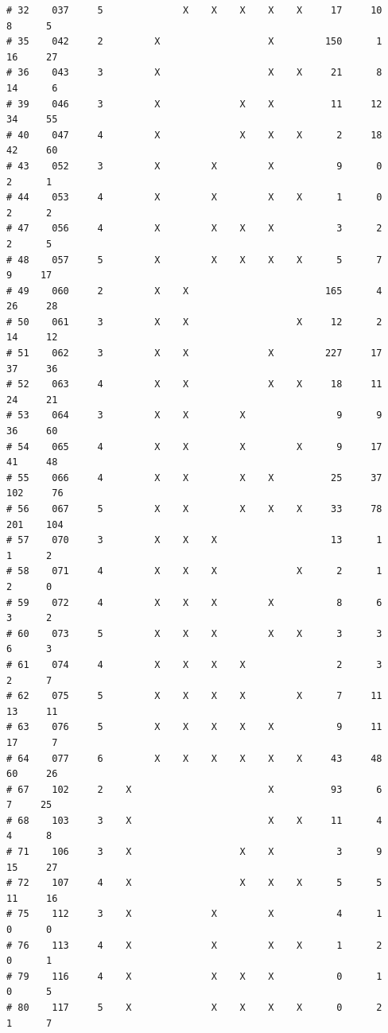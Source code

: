 \documentclass{article}\usepackage[]{graphicx}\usepackage[]{color}
\makeatletter
\newenvironment{kframe}{%
 \def\at@end@of@kframe{}%
 \ifinner\ifhmode%
  \def\at@end@of@kframe{\end{minipage}}%
  \begin{minipage}{\columnwidth}%
 \fi\fi%
 \def\FrameCommand##1{\hskip\@totalleftmargin \hskip-\fboxsep
 \colorbox{shadecolor}{##1}\hskip-\fboxsep
     \hskip-\linewidth \hskip-\@totalleftmargin \hskip\columnwidth}%
 \MakeFramed {\advance\hsize-\width
   \@totalleftmargin\z@ \linewidth\hsize
   \@setminipage}}%
 {\par\unskip\endMakeFramed%
 \at@end@of@kframe}
\newenvironment{knitrout}{}{} %
\makeatother
\begin{document}
\begin{knitrout}
\begin{kframe}
\begin{verbatim}
# 32    037     5              X    X    X    X    X     17     10      8      5
# 35    042     2         X                   X         150      1     16     27
# 36    043     3         X                   X    X     21      8     14      6
# 39    046     3         X              X    X          11     12     34     55
# 40    047     4         X              X    X    X      2     18     42     60
# 43    052     3         X         X         X           9      0      2      1
# 44    053     4         X         X         X    X      1      0      2      2
# 47    056     4         X         X    X    X           3      2      2      5
# 48    057     5         X         X    X    X    X      5      7      9     17
# 49    060     2         X    X                        165      4     26     28
# 50    061     3         X    X                   X     12      2     14     12
# 51    062     3         X    X              X         227     17     37     36
# 52    063     4         X    X              X    X     18     11     24     21
# 53    064     3         X    X         X                9      9     36     60
# 54    065     4         X    X         X         X      9     17     41     48
# 55    066     4         X    X         X    X          25     37    102     76
# 56    067     5         X    X         X    X    X     33     78    201    104
# 57    070     3         X    X    X                    13      1      1      2
# 58    071     4         X    X    X              X      2      1      2      0
# 59    072     4         X    X    X         X           8      6      3      2
# 60    073     5         X    X    X         X    X      3      3      6      3
# 61    074     4         X    X    X    X                2      3      2      7
# 62    075     5         X    X    X    X         X      7     11     13     11
# 63    076     5         X    X    X    X    X           9     11     17      7
# 64    077     6         X    X    X    X    X    X     43     48     60     26
# 67    102     2    X                        X          93      6      7     25
# 68    103     3    X                        X    X     11      4      4      8
# 71    106     3    X                   X    X           3      9     15     27
# 72    107     4    X                   X    X    X      5      5     11     16
# 75    112     3    X              X         X           4      1      0      0
# 76    113     4    X              X         X    X      1      2      0      1
# 79    116     4    X              X    X    X           0      1      0      5
# 80    117     5    X              X    X    X    X      0      2      1      7

\end{verbatim}
\end{kframe}
\end{knitrout}
\end{document}
